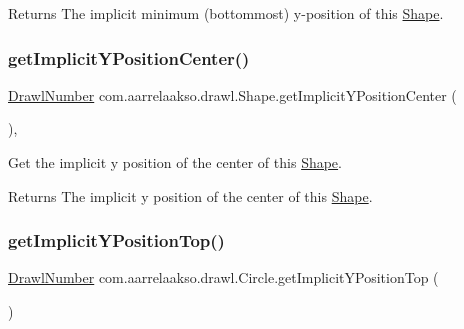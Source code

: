 \begin{DoxyReturn}{Returns}
The implicit minimum (bottommost) y-\/position of this \hyperlink{classcom_1_1aarrelaakso_1_1drawl_1_1_shape}{Shape}. 
\end{DoxyReturn}
\mbox{\label{classcom_1_1aarrelaakso_1_1drawl_1_1_shape_a0549739ee3201ae16091acce4ee6a5ac}} 
\subsubsection{\texorpdfstring{get\+Implicit\+Y\+Position\+Center()}{getImplicitYPositionCenter()}}
{\footnotesize\ttfamily \hyperlink{classcom_1_1aarrelaakso_1_1drawl_1_1_drawl_number}{Drawl\+Number} com.\+aarrelaakso.\+drawl.\+Shape.\+get\+Implicit\+Y\+Position\+Center (\begin{DoxyParamCaption}{ }\end{DoxyParamCaption})\hspace{0.3cm}{\ttfamily [protected]}, {\ttfamily [inherited]}}



Get the implicit y position of the center of this \hyperlink{classcom_1_1aarrelaakso_1_1drawl_1_1_shape}{Shape}. 

\begin{DoxyReturn}{Returns}
The implicit y position of the center of this \hyperlink{classcom_1_1aarrelaakso_1_1drawl_1_1_shape}{Shape}. 
\end{DoxyReturn}
\mbox{\label{classcom_1_1aarrelaakso_1_1drawl_1_1_circle_ae0bd8b2be28e991318bbc8e37b99553d}} 
\subsubsection{\texorpdfstring{get\+Implicit\+Y\+Position\+Top()}{getImplicitYPositionTop()}}
{\footnotesize\ttfamily \hyperlink{classcom_1_1aarrelaakso_1_1drawl_1_1_drawl_number}{Drawl\+Number} com.\+aarrelaakso.\+drawl.\+Circle.\+get\+Implicit\+Y\+Position\+Top (\begin{DoxyParamCaption}{ }\end{DoxyParamCaption})\hspace{0.3cm}{\ttfamily [protected]}}



